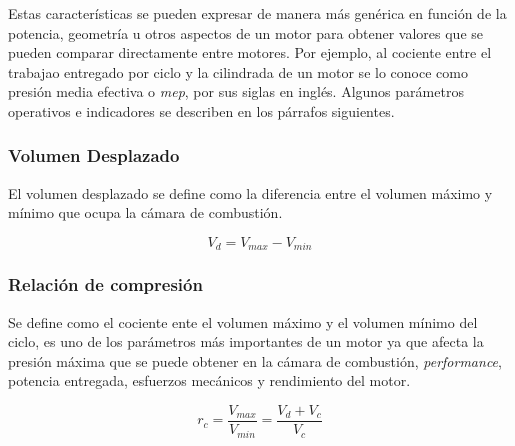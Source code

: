 Estas características se pueden expresar de manera más genérica en función de la
potencia, geometría u otros aspectos de un motor para obtener valores que se
pueden comparar directamente entre motores.
%
Por ejemplo, al cociente entre el trabajao entregado por ciclo y la cilindrada
de un motor se lo conoce como presión media efectiva o \emph{mep}, por sus
siglas en inglés.
%
Algunos parámetros operativos e indicadores se describen en los párrafos
siguientes.


\subsubsection{Volumen Desplazado}
%
El volumen desplazado se define como la diferencia entre el volumen máximo y
mínimo que ocupa la cámara de combustión.

\begin{equation}\label{eq:vol_desp} V_d = V_{max}-V_{min}
\end{equation}



\subsubsection{Relación de compresión}

Se define como el cociente ente el volumen máximo y el volumen mínimo del ciclo,
es uno de los parámetros más importantes de un motor ya que afecta la presión
máxima que se puede obtener en la cámara de combustión, \emph{performance},
potencia entregada, esfuerzos mecánicos y rendimiento del motor.

\begin{equation}\label{eq:rel_comp} r_c = \frac{V_{max}}{V_{min}} = \frac{V_d+V_c}{V_c}
\end{equation}



